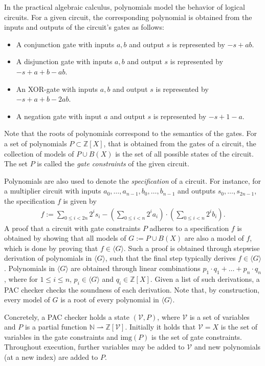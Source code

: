 In the practical algebraic calculus, polynomials model the behavior of logical circuits.
For a given circuit, the corresponding polynomial is obtained from the inputs and outputs of the circuit's gates as follows:
\begin{itemize}
	\item A conjunction gate with inputs $a,b$ and output $s$ is represented by $-s + ab$.
	\item A disjunction gate with inputs $a,b$ and output $s$ is represented by $-s + a + b - ab$.
	\item An XOR-gate with inputs $a,b$ and output $s$ is represented by $-s + a + b - 2ab$.
	\item A negation gate with input $a$ and output $s$ is represented by $-s + 1 -a$.
\end{itemize}
Note that the roots of polynomials correspond to the semantics of the gates.
For a set of polynomials $P \subset \mathbb{Z}[X]$, that is obtained from the gates of a circuit, the collection of models of $P \cup B(X)$ is the set of all possible states of the circuit.
The set $P$ is called the \textit{gate constraints} of the given circuit.

Polynomials are also used to denote the \textit{specification} of a circuit.
For instance, for a multiplier circuit with inputs $a_0, \dots, a_{n-1}, b_0, \dots, b_{n-1}$ and outputs $s_0, \dots, s_{2n-1}$, the specification $f$ is given by
\begin{gather*}
	f := \sum_{0 \le i < 2n} 2^is_i - \left(\sum_{0 \le i < n} 2^ia_i\right) \cdot \left(\sum_{0 \le i < n} 2^ib_i\right).
\end{gather*}
A proof that a circuit with gate constraints $P$ adheres to a specification $f$ is obtained by showing that all models of $G := P \cup B(X)$ are also a model of $f$, which is done by proving that $f \in \langle G \rangle$.
Such a proof is obtained through stepwise derivation of polynomials in $\langle G \rangle$, such that the final step typically derives $f \in \langle G \rangle$.
Polynomials in $\langle G \rangle$ are obtained through linear combinations $p_1 \cdot q_1 + \dots + p_n \cdot q_n$, where for $1 \le i \le n$, $p_i \in \langle G \rangle$ and $q_i \in \mathbb{Z}[X]$.
Given a list of such derivations, a PAC checker checks the soundness of each derivation.
Note that, by construction, every model of $G$ is a root of every polynomial in $\langle G \rangle$.

Concretely, a PAC checker holds a state $(\mathscr{V},P)$, where $\mathscr{V}$ is a set of variables and $P$ is a partial function $\mathbb{N} \rightharpoonup \mathbb{Z}[\mathscr{V}]$.
Initially it holds that $\mathscr{V} = X$ is the set of variables in the gate constraints and $\text{img}(P)$ is the set of gate constraints.
Throughout execution, further variables may be added to $\mathscr{V}$ and new polynomials (at a new index) are added to $P$.

